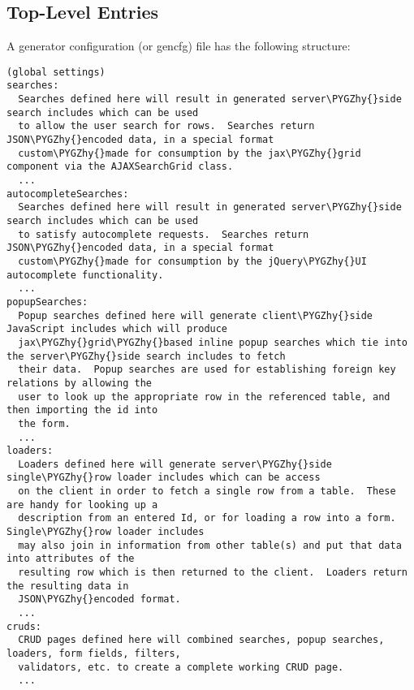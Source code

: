 \documentclass[letterpaper,10pt,english]{sphinxmanual}
\def\PYGZhy{\char`\-}
\begin{document}
\subsection{Top-Level Entries}
\label{jaxFrameworkGuide:top-level-entries}
A generator configuration (or gencfg) file has the following structure:

\begin{Verbatim}[commandchars=\\\{\}]
(global settings)
searches:
  Searches defined here will result in generated server\PYGZhy{}side search includes which can be used
  to allow the user search for rows.  Searches return JSON\PYGZhy{}encoded data, in a special format
  custom\PYGZhy{}made for consumption by the jax\PYGZhy{}grid component via the AJAXSearchGrid class.
  ...
autocompleteSearches:
  Searches defined here will result in generated server\PYGZhy{}side search includes which can be used
  to satisfy autocomplete requests.  Searches return JSON\PYGZhy{}encoded data, in a special format
  custom\PYGZhy{}made for consumption by the jQuery\PYGZhy{}UI autocomplete functionality.
  ...
popupSearches:
  Popup searches defined here will generate client\PYGZhy{}side JavaScript includes which will produce
  jax\PYGZhy{}grid\PYGZhy{}based inline popup searches which tie into the server\PYGZhy{}side search includes to fetch
  their data.  Popup searches are used for establishing foreign key relations by allowing the
  user to look up the appropriate row in the referenced table, and then importing the id into
  the form.
  ...
loaders:
  Loaders defined here will generate server\PYGZhy{}side single\PYGZhy{}row loader includes which can be access
  on the client in order to fetch a single row from a table.  These are handy for looking up a
  description from an entered Id, or for loading a row into a form.  Single\PYGZhy{}row loader includes
  may also join in information from other table(s) and put that data into attributes of the
  resulting row which is then returned to the client.  Loaders return the resulting data in
  JSON\PYGZhy{}encoded format.
  ...
cruds:
  CRUD pages defined here will combined searches, popup searches, loaders, form fields, filters,
  validators, etc. to create a complete working CRUD page.
  ...
\end{Verbatim}
\end{document}
